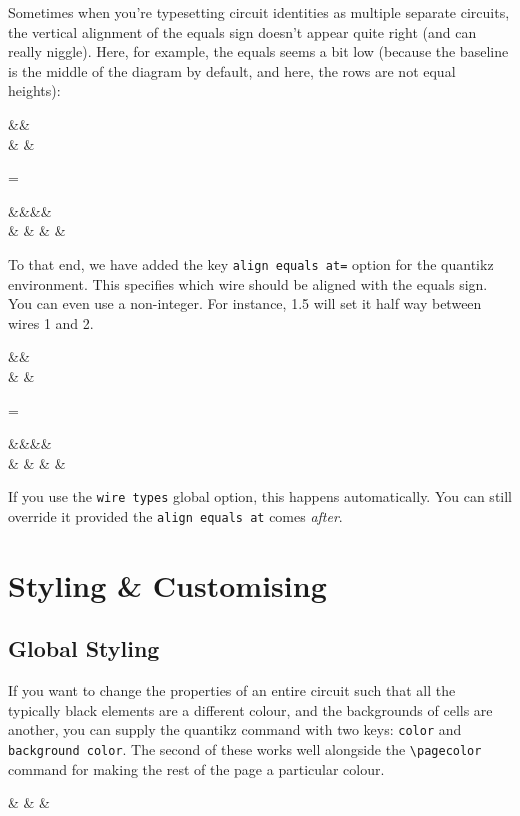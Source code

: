 \documentclass[aps,pra,10pt,nofootinbib]{revtex4-2}
\begin{document}
Sometimes when you're typesetting circuit identities as multiple separate circuits, the vertical alignment of the equals sign doesn't appear quite right (and can really niggle). Here, for example, the equals seems a bit low (because the baseline is the middle of the diagram by default, and here, the rows are not equal heights):
\begin{Code}
\begin{quantikz}
&& \\
&  &
 \end{quantikz}=\begin{quantikz}
&&&& \\
&  &  &  &
 \end{quantikz}
\end{Code}
To that end, we have added the key \texttt{align equals at=} option for the quantikz environment. This specifies which wire should be aligned with the equals sign. You can even use a non-integer. For instance, 1.5 will set it half way between wires 1 and 2.
\begin{Code}
\begin{quantikz}[align equals at=1.5]
&& \\
&  &
 \end{quantikz}=\begin{quantikz}[align equals at=1.5]
&&&& \\
&  &  &  &
 \end{quantikz}
\end{Code}
If you use the \texttt{wire types} global option, this happens automatically. You can still override it provided the \texttt{align equals at} comes \emph{after}.

\section{Styling \& Customising}\label{sec:style}

\subsection{Global Styling}

If you want to change the properties of an entire circuit such that all the typically black elements are a different colour, and the backgrounds of cells are another, you can supply the quantikz command with two keys: \verb!color! and \verb!background color!. The second of these works well alongside the \verb!\pagecolor! command for making the rest of the page a particular colour.
\begin{Code}
\begin{quantikz}[color=blue,background color=yellow]
\lstick{\ket{\psi}} &  &  & \meter{}
\end{quantikz}
\end{Code}
\end{document}
